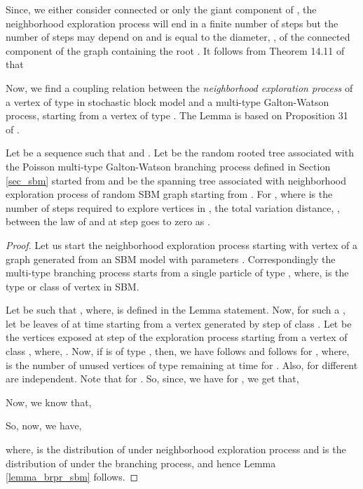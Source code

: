 \documentclass[graybox]{svmult}
\begin{document}
Since, we either consider  connected or only the giant component of , the neighborhood exploration process will end in a finite number of steps but the number of steps may depend on  and is equal to the diameter, , of the connected component of the graph containing the root . It follows from Theorem 14.11 of \cite{bollobas2007phase} that






Now, we find a coupling relation between the \textit{neighborhood exploration process} of a vertex of type  in stochastic block model and a multi-type Galton-Watson process,  starting from a vertex of type . The Lemma is based on Proposition 31 of \cite{bordenave2015non}.

\begin{lemma}
\label{lemma_brpr_sbm}
Let  be a sequence such that  and . Let  be the random rooted tree associated with the Poisson multi-type Galton-Watson branching process defined in Section \ref{sec_sbm} started from  and  be the spanning tree associated with neighborhood exploration process of random SBM graph  starting from . For , where  is the number of steps required to explore  vertices in , the total variation distance, , between the law of  and  at step  goes to zero as .
\end{lemma}
\begin{proof}
Let us start the neighborhood exploration process starting with vertex  of a graph generated from an SBM model with parameters . Correspondingly the multi-type branching process starts from a single particle of type , where,  is the type or class of vertex  in SBM. 

Let  be such that , where,  is defined in the Lemma statement.
Now, for such a , let  be leaves of  at time  starting from a vertex  generated by step  of class . Let  be the vertices exposed at step  of the exploration process starting from a vertex of class , where, . Now, if  is of type , then, we have  follows  and  follows  for , where,  is the number of unused vertices of type  remaining at time  for . Also,  for different  are independent. Note that  for . So, since, we have  for , we get that,



Now, we know that,

So, now, we have,

where,  is the distribution of  under neighborhood exploration process and  is the distribution of  under the branching process, and hence Lemma \ref{lemma_brpr_sbm} follows.
\end{proof}
\end{document}
